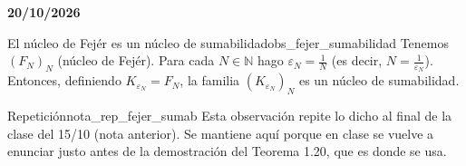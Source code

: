 \textbf{20/10/2026}

\begin{observacion}{El núcleo de Fejér es un núcleo de sumabilidad}{obs_fejer_sumabilidad}
Tenemos $(F_N)_N$ (núcleo de Fejér). Para cada $N \in \mathbb{N}$ hago $\varepsilon_N = \frac{1}{N}$ (es decir, $N = \frac{1}{\varepsilon_N}$). Entonces, definiendo $K_{\varepsilon_N} = F_N$, la familia $(K_{\varepsilon_N})_N$ es un núcleo de sumabilidad.
\end{observacion}

\begin{nota}{Repetición}{nota_rep_fejer_sumab}
Esta observación repite lo dicho al final de la clase del 15/10 (nota anterior). Se mantiene aquí porque en clase se vuelve a enunciar justo antes de la demostración del Teorema 1.20, que es donde se usa.
\end{nota}

